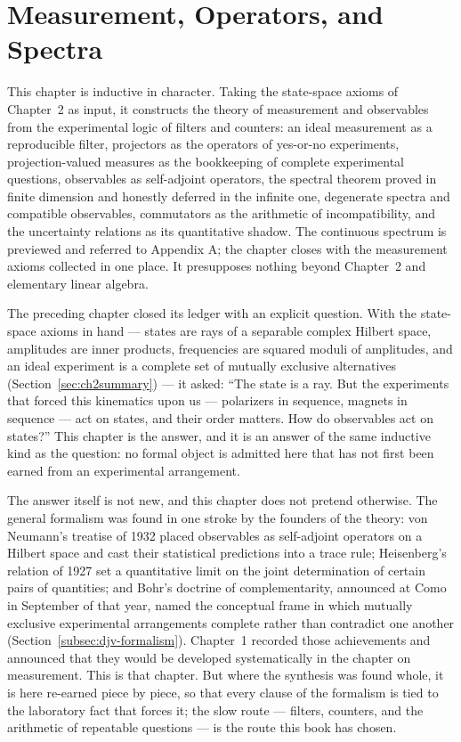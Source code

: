 \chapter{Measurement, Operators, and Spectra}
\begin{note}
    This chapter is inductive in character. Taking the state-space axioms of Chapter~2 as input, it constructs the theory of measurement and observables from the experimental logic of filters and counters: an ideal measurement as a reproducible filter, projectors as the operators of yes-or-no experiments, projection-valued measures as the bookkeeping of complete experimental questions, observables as self-adjoint operators, the spectral theorem proved in finite dimension and honestly deferred in the infinite one, degenerate spectra and compatible observables, commutators as the arithmetic of incompatibility, and the uncertainty relations as its quantitative shadow. The continuous spectrum is previewed and referred to Appendix A; the chapter closes with the measurement axioms collected in one place. It presupposes nothing beyond Chapter~2 and elementary linear algebra.
\end{note}

The preceding chapter closed its ledger with an explicit question. With the state-space axioms in hand --- states are rays of a separable complex Hilbert space, amplitudes are inner products, frequencies are squared moduli of amplitudes, and an ideal experiment is a complete set of mutually exclusive alternatives (Section~\ref{sec:ch2summary}) --- it asked: ``The state is a ray. But the experiments that forced this kinematics upon us --- polarizers in sequence, magnets in sequence --- act on states, and their order matters. How do observables act on states?'' This chapter is the answer, and it is an answer of the same inductive kind as the question: no formal object is admitted here that has not first been earned from an experimental arrangement.

The answer itself is not new, and this chapter does not pretend otherwise. The general formalism was found in one stroke by the founders of the theory: von Neumann's treatise of 1932 placed observables as self-adjoint operators on a Hilbert space and cast their statistical predictions into a trace rule; Heisenberg's relation of 1927 set a quantitative limit on the joint determination of certain pairs of quantities; and Bohr's doctrine of complementarity, announced at Como in September of that year, named the conceptual frame in which mutually exclusive experimental arrangements complete rather than contradict one another (Section~\ref{subsec:djv-formalism}). Chapter~1 recorded those achievements and announced that they would be developed systematically in the chapter on measurement. This is that chapter. But where the synthesis was found whole, it is here re-earned piece by piece, so that every clause of the formalism is tied to the laboratory fact that forces it; the slow route --- filters, counters, and the arithmetic of repeatable questions --- is the route this book has chosen.

